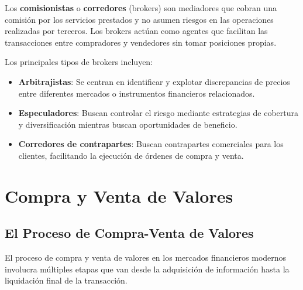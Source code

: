 \begin{definicion}
Los \textbf{comisionistas} o \textbf{corredores} (brokers) son mediadores que cobran una comisión por los servicios prestados y no asumen riesgos en las operaciones realizadas por terceros. Los brokers actúan como agentes que facilitan las transacciones entre compradores y vendedores sin tomar posiciones propias.
\end{definicion}

Los principales tipos de brokers incluyen:

\begin{itemize}
\item \textbf{Arbitrajistas}: Se centran en identificar y explotar discrepancias de precios entre diferentes mercados o instrumentos financieros relacionados.

\item \textbf{Especuladores}: Buscan controlar el riesgo mediante estrategias de cobertura y diversificación mientras buscan oportunidades de beneficio.

\item \textbf{Corredores de contrapartes}: Buscan contrapartes comerciales para los clientes, facilitando la ejecución de órdenes de compra y venta.
\end{itemize}

\section{Compra y Venta de Valores}

\subsection{El Proceso de Compra-Venta de Valores}

El proceso de compra y venta de valores en los mercados financieros modernos involucra múltiples etapas que van desde la adquisición de información hasta la liquidación final de la transacción.

